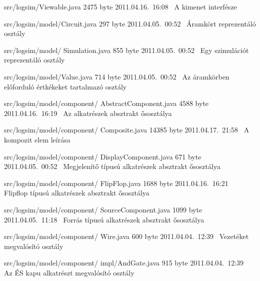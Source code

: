 \begin{fajllista}
\fajl
{src/logsim/Viewable.java} %
{2475 byte} %
{2011.04.16.~16:08~} %
{A kimenet interfésze} %

\fajl
{src/logsim/model/Circuit.java} %
{297 byte} %
{2011.04.05.~00:52~} %
{Áramkört reprezentáló osztály} %

\fajl
{src/logsim/model/\newline
Simulation.java} %
{855 byte} %
{2011.04.05.~00:52~} %
{Egy szimulációt reprezentáló osztály} %

\fajl
{src/logsim/model/Value.java} %
{714 byte} %
{2011.04.05.~00:52~} %
{Az áramkörben előforduló értkékeket tartalmazó osztály} %

\fajl
{src/logsim/model/component/\newline
AbstractComponent.java} %
{4588 byte} %
{2011.04.16.~16:19~} %
{Az alkatrészek absztrakt ősosztálya} %

\fajl
{src/logsim/model/component/\newline
Composite.java} %
{14385 byte} %
{2011.04.17.~21:58~} %
{A kompozit elem leírása} %

\fajl
{src/logsim/model/component/\newline
DisplayComponent.java} %
{671 byte} %
{2011.04.05.~00:52~} %
{Megjelenítő típusú alkatrészek absztrakt ősosztálya} %

\fajl
{src/logsim/model/component/\newline
FlipFlop.java} %
{1688 byte} %
{2011.04.16.~16:21~} %
{Flipflop típusú alkatrészek absztrakt ősosztálya} %

\fajl
{src/logsim/model/component/\newline
SourceComponent.java} %
{1099 byte} %
{2011.04.05.~11:18~} %
{Forrás típusú alkatrészek absztrakt ősosztálya} %

\fajl
{src/logsim/model/component/\newline
Wire.java} %
{600 byte} %
{2011.04.04.~12:39~} %
{Vezetéket megvalósító osztály} %

\fajl
{src/logsim/model/component/\newline
impl/AndGate.java} %
{915 byte} %
{2011.04.04.~12:39~} %
{Az ÉS kapu alkatrészt megvalósító osztály} %


\end{fajllista}
